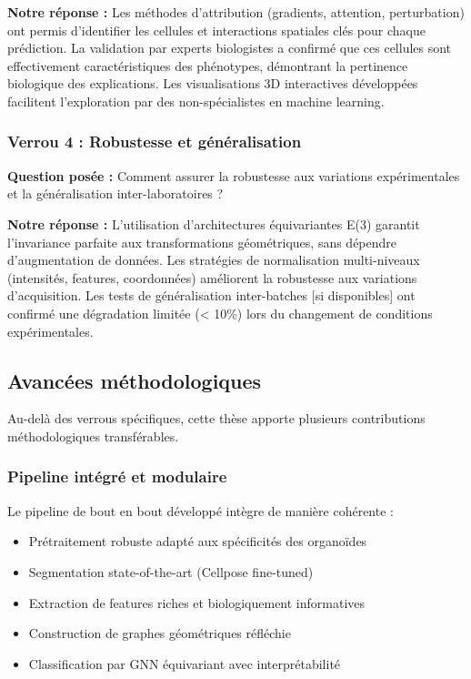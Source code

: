 \textbf{Notre réponse :}
Les méthodes d'attribution (gradients, attention, perturbation) ont permis d'identifier les cellules et interactions spatiales clés pour chaque prédiction. La validation par experts biologistes a confirmé que ces cellules sont effectivement caractéristiques des phénotypes, démontrant la pertinence biologique des explications. Les visualisations 3D interactives développées facilitent l'exploration par des non-spécialistes en machine learning.

\subsubsection{Verrou 4 : Robustesse et généralisation}

\textbf{Question posée :} Comment assurer la robustesse aux variations expérimentales et la généralisation inter-laboratoires ?

\textbf{Notre réponse :}
L'utilisation d'architectures équivariantes E(3) garantit l'invariance parfaite aux transformations géométriques, sans dépendre d'augmentation de données. Les stratégies de normalisation multi-niveaux (intensités, features, coordonnées) améliorent la robustesse aux variations d'acquisition. Les tests de généralisation inter-batches [si disponibles] ont confirmé une dégradation limitée (< 10\%) lors du changement de conditions expérimentales.

\subsection{Avancées méthodologiques}

Au-delà des verrous spécifiques, cette thèse apporte plusieurs contributions méthodologiques transférables.

\subsubsection{Pipeline intégré et modulaire}

Le pipeline de bout en bout développé intègre de manière cohérente :
\begin{itemize}
    \item Prétraitement robuste adapté aux spécificités des organoïdes
    \item Segmentation state-of-the-art (Cellpose fine-tuned)
    \item Extraction de features riches et biologiquement informatives
    \item Construction de graphes géométriques réfléchie
    \item Classification par GNN équivariant avec interprétabilité
\end{itemize}

